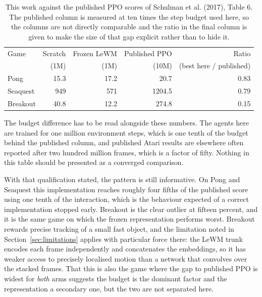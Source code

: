 \documentclass[11pt,a4paper]{article}
\begin{document}
\begin{table}[h]
\centering
\caption{This work against the published PPO scores of Schulman et al. (2017),
Table 6. The published column is measured at ten times the step budget used here,
so the columns are not directly comparable and the ratio in the final column is
given to make the size of that gap explicit rather than to hide it.}
\label{tab:published}
\begin{tabular}{lrrrr}
\toprule
Game & Scratch & Frozen LeWM & Published PPO & Ratio \\
     & (1M)    & (1M)        & (10M)         & (best here / published) \\
\midrule
Pong     & 15.3 & 17.2 &   20.7 & 0.83 \\
Seaquest & 949  & 571  & 1204.5 & 0.79 \\
Breakout & 40.8 & 12.2 &  274.8 & 0.15 \\
\bottomrule
\end{tabular}
\end{table}

The budget difference has to be read alongside these numbers. The agents here are
trained for one million environment steps, which is one tenth of the budget behind
the published column, and published Atari results are elsewhere often reported
after two hundred million frames, which is a factor of fifty. Nothing in this table
should be presented as a converged comparison.

With that qualification stated, the pattern is still informative. On Pong and
Seaquest this implementation reaches roughly four fifths of the published score
using one tenth of the interaction, which is the behaviour expected of a correct
implementation stopped early. Breakout is the clear outlier at fifteen percent, and
it is the same game on which the frozen representation performs worst. Breakout
rewards precise tracking of a small fast object, and the limitation noted in
Section~\ref{sec:limitations} applies with particular force there: the LeWM trunk
encodes each frame independently and concatenates the embeddings, so it has weaker
access to precisely localised motion than a network that convolves over the stacked
frames. That this is also the game where the gap to published PPO is widest for
\emph{both} arms suggests the budget is the dominant factor and the representation
a secondary one, but the two are not separated here.
\end{document}
